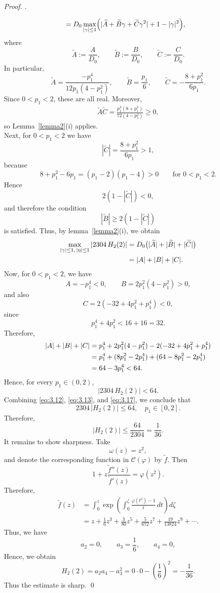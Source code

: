 \documentclass[a4paper,12pt,reqno]{amsart} %
\numberwithin{equation}{section}
\theoremstyle{definition}
\newenvironment{pf}[1][]{%
	\vskip 3mm
	\noindent
	\ifthenelse{\equal{#1}{}}%
	{{\slshape Proof. }}%
	{{\slshape #1.} }%
}%
{\qed\bigskip}
\begin{document}
\begin{pf}
\begin{align}
&=
D_0\max_{|\gamma|\le 1}\Bigl(
|\widetilde{A}+\widetilde{B}\gamma+\widetilde{C}\gamma^2|
+1-|\gamma|^2
\Bigr),
\end{align}
where
\[
\widetilde{A}:=\frac{A}{D_0},
\qquad
\widetilde{B}:=\frac{B}{D_0},
\qquad
\widetilde{C}:=\frac{C}{D_0}.
\]
In particular,
\[
\widetilde{A}=\frac{-p_1^4}{12p_1(4-p_1^2)},
\qquad
\widetilde{B}=\frac{p_1}{6},
\qquad
\widetilde{C}=-\frac{8+p_1^2}{6p_1}.
\]
Since $0<p_1<2$, these are all real. Moreover,
\begin{align*}
\widetilde{A}\widetilde{C}
=
\frac{p_1^2(8+p_1^2)}{72(4-p_1^2)}
\ge 0,
\end{align*}
so Lemma~\ref{lemma2}(i) applies.\\[2mm]
Next, for $0<p_1<2$ we have
\[
|\widetilde{C}|=\frac{8+p_1^2}{6p_1}>1,
\]
because
\[
8+p_1^2-6p_1=(p_1-2)(p_1-4)>0
\qquad \text{for } 0<p_1<2.
\]
Hence
\[
2(1-|\widetilde{C}|)<0,
\]
and therefore the condition
\[
|\widetilde{B}|\ge 2(1-|\widetilde{C}|)
\]
is  satisfied. Thus, by lemma~\ref{lemma2}(i), we obtain
\begin{align}\label{eq:3.15}
\max_{|\gamma|\le 1,\,|\eta|\le 1}|2304\,H_2(2)|
&=
D_0\bigl(|\widetilde{A}|+|\widetilde{B}|+|\widetilde{C}|\bigr) \notag\\
&=
|A|+|B|+|C|.
\end{align}	
Now, for $0<p_1<2$, we have
\[
A=-p_1^4<0,
\qquad
B=2p_1^2(4-p_1^2)>0,
\]
and also
\[
C=2(-32+4p_1^2+p_1^4)<0,
\]
since
\[
p_1^4+4p_1^2<16+16=32.
\]
Therefore,
\begin{align}\label{eq:3.16}
|A|+|B|+|C|
&=
p_1^4+2p_1^2(4-p_1^2)-2(-32+4p_1^2+p_1^4) \notag\\
&=
p_1^4+(8p_1^2-2p_1^4)+(64-8p_1^2-2p_1^4) \notag\\
&=
64-3p_1^4
<64.
\end{align}
Hence, for every $p_1\in(0,2)$,
\begin{equation}\label{eq:3.17}
|2304\,H_2(2)|<64.
\end{equation}
Combining \eqref{eq:3.12}, \eqref{eq:3.13}, and \eqref{eq:3.17}, we conclude that
\[
2304\,|H_2(2)|\le 64,
\quad p_1\in[0,2].
\]
Therefore,
\[
|H_2(2)|\le \frac{64}{2304}=\frac{1}{36}.
\]
It remains to show sharpness. Take
\[
\omega(z)=z^2,
\]
and denote the corresponding function in $\mathcal{C}(\varphi)$ by $\widetilde{f}$. Then
\[
1+z\frac{\widetilde{f}''(z)}{\widetilde{f}'(z)}=\varphi(z^2).
\]
Therefore,
\begin{align*}
\widetilde{f}(z)
&=
\int_0^z
\exp\!\left(
\int_0^\zeta \frac{\varphi(t^2)-1}{t}\,dt
\right)d\zeta \\[4pt]
&=
z+\frac{1}{6}z^3+\frac{3}{80}z^5+\frac{5}{672}z^7+\frac{19}{13824}z^9+\cdots.
\end{align*}
Thus, we have 
\[
a_2=0,\qquad a_3=\frac{1}{6},\qquad a_4=0,
\]
Hence, we obtain
\[
H_2(2)=a_2 a_4-a_3^2
=
0\cdot 0-\left(\frac{1}{6}\right)^2
=
-\frac{1}{36}.
\]
Thus the estimate is sharp.
\end{pf}\\
\end{document}
